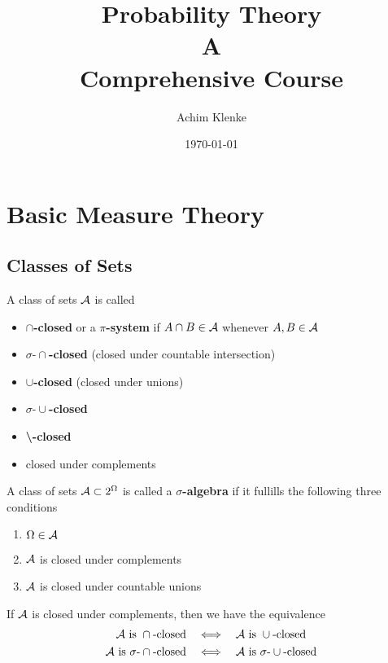 \documentclass[11pt]{article}
\author{Achim Klenke}
\date{\today}
\title{\aunclfamily\Huge Probability Theory\\ A \\Comprehensive Course}
\begin{document}
\maketitle \clearpage
\tableofcontents \clearpage\section{Basic Measure Theory}
\label{sec:orgea0c38c}
\subsection{Classes of Sets}
\label{sec:orgff5ba97}
\begin{definition}[]
A class of sets \(\mathcal{A}\) is called
\begin{itemize}
\item \textbf{\(\cap\)-closed} or a \textbf{\(\pi\)-system} if \(A\cap B\in\mathcal{A}\) whenever \(A,B\in\mathcal{A}\)
\item \textbf{\(\sigma\text{-}\cap\)-closed} (closed under countable intersection)
\item \textbf{\(\cup\)-closed} (closed under unions)
\item \textbf{\(\sigma\text{-}\cup\)-closed}
\item \textbf{\textbackslash-closed}
\item closed under complements
\end{itemize}
\end{definition}

\begin{definition}
A class of sets \(\mathcal{A}\subset 2^{\Omega}\) is called a \textbf{\(\sigma\)-algebra} if it
fullills the following three conditions
\begin{enumerate}
\item \(\Omega\in\mathcal{A}\)
\item \(\mathcal{A}\) is closed under complements
\item \(\mathcal{A}\) is closed under countable unions
\end{enumerate}
\end{definition}


\begin{theorem}[]
If \(\mathcal{A}\) is closed under complements, then we have the equivalence
\begin{align*}
\mathcal{A}\text{ is }\cap\text{-closed}\quad&\Longleftrightarrow\quad\mathcal{A}\text{ is }
\cup\text{-closed}\\
\mathcal{A}\text{ is }\sigma\text{-}\cap\text{-closed}\quad&\Longleftrightarrow\quad\mathcal{A}\text{ is }
\sigma\text{-}\cup\text{-closed}
\end{align*}
\end{theorem}
\end{document}
